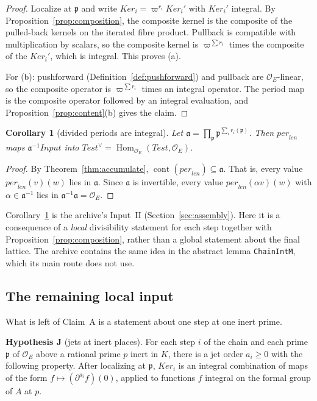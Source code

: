 \documentclass[11pt]{amsart}
\newtheorem{corollary}[theorem]{Corollary}
\theoremstyle{definition}
\theoremstyle{remark}
\newcommand{\OEring}{\mathcal{O}_E}
\newcommand{\Input}{\mathit{Input}}
\newcommand{\Test}{\mathit{Test}}
\newcommand{\per}{\mathit{per}}
\newcommand{\len}{\mathit{len}}
\newcommand{\Ker}{\mathit{Ker}}
\DeclareMathOperator{\Hom}{Hom}
\DeclareMathOperator{\cont}{cont}
\newcommand{\pp}{\mathfrak{p}}
\newcommand{\dual}{^{\vee}}
\begin{document}
\begin{proof}
Localize at $\pp$ and write $\Ker_i=\varpi^{r_i}\Ker_i'$ with $\Ker_i'$ integral. By Proposition~\ref{prop:composition}, the composite kernel is the composite of the pulled-back kernels on the iterated fibre product. Pullback is compatible with multiplication by scalars, so the composite kernel is $\varpi^{\sum r_i}$ times the composite of the $\Ker_i'$, which is integral. This proves (a).

For (b): pushforward (Definition~\ref{def:pushforward}) and pullback are $\OEring$-linear, so the composite operator is $\varpi^{\sum r_i}$ times an integral operator. The period map is the composite operator followed by an integral evaluation, and Proposition~\ref{prop:content}(b) gives the claim.
\end{proof}

\begin{corollary}[divided periods are integral]\label{cor:divided}
Let $\mathfrak a=\prod_\pp\pp^{\sum_ir_i(\pp)}$. Then $\per_\len$ maps $\mathfrak a^{-1}\Input$ into $\Test\dual=\Hom_{\OEring}(\Test,\OEring)$.
\end{corollary}

\begin{proof}
By Theorem~\ref{thm:accumulate}, $\cont(\per_\len)\subseteq\mathfrak a$. That is, every value $\per_\len(v)(w)$ lies in $\mathfrak a$. Since $\mathfrak a$ is invertible, every value $\per_\len(\alpha v)(w)$ with $\alpha\in\mathfrak a^{-1}$ lies in $\mathfrak a^{-1}\mathfrak a=\OEring$.
\end{proof}

Corollary~\ref{cor:divided} is the archive's Input~II (Section~\ref{sec:assembly}). Here it is a consequence of a \emph{local} divisibility statement for each step together with Proposition~\ref{prop:composition}, rather than a global statement about the final lattice. The archive contains the same idea in the abstract lemma \texttt{ChainIntM}, which its main route does not use.

\subsection{The remaining local input}
What is left of Claim~A is a statement about one step at one inert prime.

\noindent\textbf{Hypothesis J} (jets at inert places). For each step $i$ of the chain and each prime $\pp$ of $\OEring$ above a rational prime $p$ inert in $K$, there is a jet order $a_i\ge0$ with the following property. After localizing at $\pp$, $\Ker_i$ is an integral combination of maps of the form $f\mapsto(\partial^{a_i}f)(0)$, applied to functions $f$ integral on the formal group of $A$ at $p$.
\end{document}
